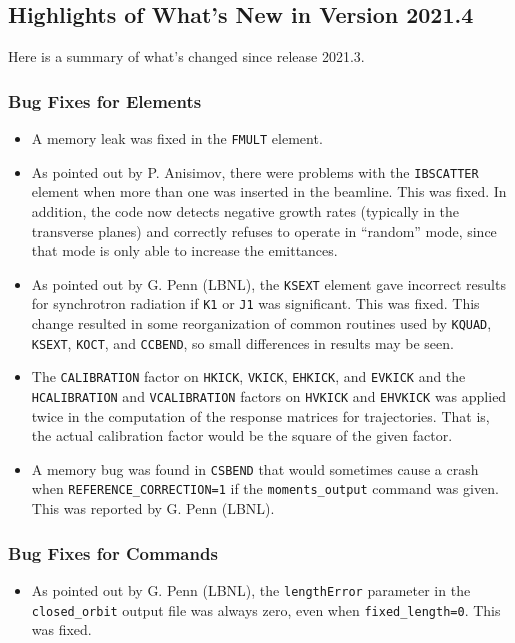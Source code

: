 \documentclass[11pt]{article}
\begin{document}
\subsection{Highlights of What's New in Version 2021.4}

Here is a summary of what's changed since release 2021.3.  

\subsubsection{Bug Fixes for Elements}

\begin{itemize}
\item A memory leak was fixed in the \verb|FMULT| element.
\item As pointed out by P. Anisimov, there were problems with the \verb|IBSCATTER| element when more than one
  was inserted in the beamline. This was fixed. In addition, the code now detects negative growth rates (typically
  in the transverse planes) and correctly refuses to operate in ``random'' mode, since that mode is only able
  to increase the emittances.
\item As pointed out by G. Penn (LBNL), the \verb|KSEXT| element gave incorrect results for synchrotron radiation
  if \verb|K1| or \verb|J1| was significant. This was fixed. This change resulted in some reorganization of common
  routines used by \verb|KQUAD|, \verb|KSEXT|, \verb|KOCT|, and \verb|CCBEND|, so small differences in results
  may be seen.
\item The \verb|CALIBRATION| factor on \verb|HKICK|, \verb|VKICK|, \verb|EHKICK|, and \verb|EVKICK| and the
  \verb|HCALIBRATION| and \verb|VCALIBRATION| factors on \verb|HVKICK| and \verb|EHVKICK| was applied twice
  in the computation of the response matrices for trajectories. That is, the actual calibration factor would
  be the square of the given factor.
\item A memory bug was found in \verb|CSBEND| that would sometimes cause a crash when \verb|REFERENCE_CORRECTION=1|
  if the \verb|moments_output| command was given. This was reported by G. Penn (LBNL).
\end{itemize}

\subsubsection{Bug Fixes for Commands}
\begin{itemize}
\item As pointed out by G. Penn (LBNL), the \verb|lengthError| parameter in the \verb|closed_orbit| output file
  was always zero, even when \verb|fixed_length=0|. This was fixed.
\end{itemize}
\end{document}
